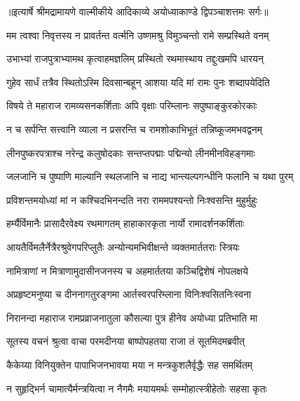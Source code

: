 {॥इत्यार्षे श्रीमद्रामायणे वाल्मीकीये आदिकाव्ये अयोध्याकाण्डे द्विपञ्चाशत्तमः सर्गः॥}


\twolineshloka
{मम त्वश्वा निवृत्तस्य न प्रावर्तन्त वर्त्मनि}
{उष्णमश्रु विमुञ्चन्तो रामे सम्प्रस्थिते वनम्} %

\twolineshloka
{उभाभ्यां राजपुत्राभ्यामथ कृत्वाहमज्ञलिम्}
{प्रस्थितो रथमास्थाय तद्दुःखमपि धारयन्} %

\twolineshloka
{गुहेव सार्धं तत्रैव स्थितोऽस्मि दिवसान्बहून्}
{आशया यदि मां रामः पुनः शब्दापयेदिति} %

\twolineshloka
{विषये ते महाराज रामव्यसनकर्शिताः}
{अपि वृक्षाः परिम्लानः सपुष्पाङ्कुरकोरकाः} %

\twolineshloka
{न च सर्पन्ति सत्त्वानि व्याला न प्रसरन्ति च}
{रामशोकाभिभूतं तन्निष्कूजमभवद्वनम्} %

\twolineshloka
{लीनपुष्करपत्राश्च नरेन्द्र कलुषोदकाः}
{सन्तप्तपद्माः पद्मिन्यो लीनमीनविहङ्गमाः} %

\twolineshloka
{जलजानि च पुष्पाणि माल्यानि स्थलजानि च}
{नाद्य भान्त्यल्पगन्धीनि फलानि च यथा पुरम्} %

\twolineshloka
{प्रविशन्तमयोध्यां मां न कश्चिदभिनन्दति}
{नरा राममपश्यन्तो निःश्वसन्ति मुहुर्मुहुः} %

\twolineshloka
{हर्म्यैर्विमानैः प्रासादैरवेक्ष्य रथमागतम्}
{हाहाकारकृता नार्यो रामादर्शनकर्शिताः} %

\twolineshloka
{आयतैर्विमलैर्नेत्रैरश्रुवेगपरिप्लुतैः}
{अन्योन्यमभिवीक्षन्ते व्यक्तमार्ततराः स्त्रियः} %

\twolineshloka
{नामित्राणां न मित्राणामुदासीनजनस्य च}
{अहमार्ततया कञ्चिद्विशेषं नोपलक्षये} %

\twolineshloka
{अप्रहृष्टमनुष्या च दीननागतुरङ्गमा}
{आर्तस्वरपरिम्लाना विनिःश्वसितनिःस्वना} %

\twolineshloka
{निरानन्दा महाराज रामप्रव्राजनातुला}
{कौसल्या पुत्र हीनेव अयोध्या प्रतिभाति मा} %

\twolineshloka
{सूतस्य वचनं श्रुत्वा वाचा परमदीनया}
{बाष्पोपहतया राजा तं सूतमिदमब्रवीत्} %

\twolineshloka
{कैकेय्या विनियुक्तेन पापाभिजनभावया}
{मया न मन्त्रकुशलैर्वृद्धैः सह समर्थितम्} %

\twolineshloka
{न सुहृद्भिर्न चामात्यैर्मन्त्रयित्वा न नैगमैः}
{मयायमर्थः सम्मोहात्स्त्रीहेतोः सहसा कृतः} %

